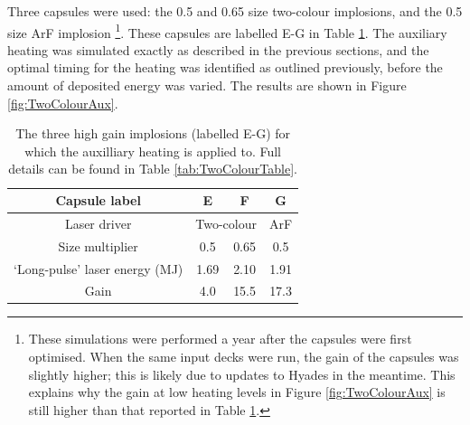 Three capsules were used: the 0.5 and 0.65 size two-colour implosions, and the 0.5 size ArF implosion \footnote{These simulations were performed a year after the capsules were first optimised. When the same input decks were run, the gain of the capsules was slightly higher; this is likely due to updates to Hyades in the meantime. This explains why the gain at low heating levels in Figure \ref{fig:TwoColourAux} is still higher than that reported in Table \ref{tab:Heating two colour capsules}.}.  These capsules are labelled E-G in Table \ref{tab:Heating two colour capsules}. The auxiliary heating was simulated exactly as described in the previous sections, and the optimal timing for the heating was identified as outlined previously, before the amount of deposited energy was varied. The results are shown in Figure \ref{fig:TwoColourAux}.

\begin{table}
\centering
\begin{tabular}{|c|c|c|c|}
\hline
Capsule label &  E & F & G  \\ 
\hline
Laser driver & \multicolumn{2}{c|}{Two-colour} & ArF \\ 
\hline
Size multiplier & 0.5 & 0.65 & 0.5 \\
\hline
`Long-pulse' laser energy (MJ) & 1.69  & 2.10 & 1.91 \\ 
Gain & 4.0 & 15.5 & 17.3 \\ 
\hline
  \end{tabular}
  \caption{The three high gain implosions (labelled E-G) for which the auxilliary heating is applied to. Full details can be found in Table \ref{tab:TwoColourTable}.}
  \label{tab:Heating two colour capsules}
\end{table}

